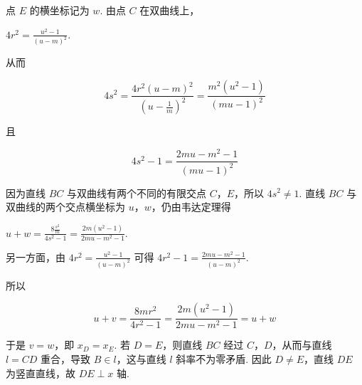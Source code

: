 \begin{solution}
\begin{enumerate}
点 \(E\) 的横坐标记为 \(w\). 由点 \(C\) 在双曲线上，

\(4r^{2}=\frac{u^{2}-1}{(u-m)^{2}}\).

从而

\[
4s^{2}=\frac{4r^{2}(u-m)^{2}}{(u-\frac{1}{m})^{2}}=\frac{m^{2}(u^{2}-1)}{(mu-1)^{2}}
\]

且

\[
4s^{2}-1=\frac{2mu-m^{2}-1}{(mu-1)^{2}}
\]

因为直线 \(BC\) 与双曲线有两个不同的有限交点 \(C\)，\(E\)，所以 \(4s^{2}\ne1\). 直线 \(BC\) 与双曲线的两个交点横坐标为 \(u\)，\(w\)，仍由韦达定理得

\(u+w=\frac{8\frac{s^{2}}{m}}{4s^{2}-1}=\frac{2m(u^{2}-1)}{2mu-m^{2}-1}\).

另一方面，由 \(4r^{2}=\frac{u^{2}-1}{(u-m)^{2}}\) 可得
\(4r^{2}-1=\frac{2mu-m^{2}-1}{(u-m)^{2}}\).

所以

\[
u+v=\frac{8mr^{2}}{4r^{2}-1}=\frac{2m(u^{2}-1)}{2mu-m^{2}-1}=u+w
\]

于是 \(v=w\)，即 \(x_D=x_E\). 若 \(D=E\)，则直线 \(BC\) 经过 \(C\)，\(D\)，从而与直线 \(l=CD\) 重合，导致 \(B\in l\)，这与直线 \(l\) 斜率不为零矛盾. 因此 \(D\ne E\)，直线 \(DE\) 为竖直直线，故 \(DE\perp x\) 轴.
\end{enumerate}
\end{solution}
